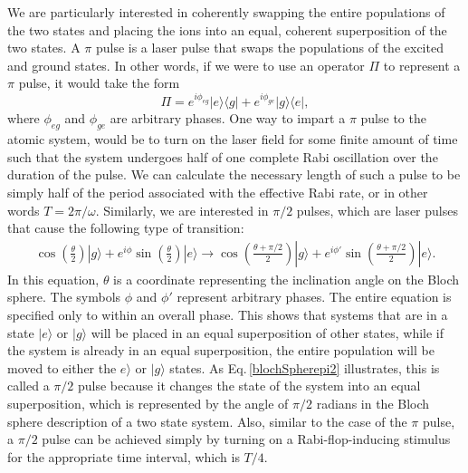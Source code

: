 We are particularly interested in coherently swapping the entire populations of the two states and placing the ions into an equal, coherent superposition of the two states.
A $\pi$ pulse is a laser pulse that swaps the populations of the excited and ground states. In other words, if we were to use an operator $\Pi$ to represent a $\pi$ pulse, it would take the form
\begin{equation}
\Pi=e^{i\phi_{eg}}|e\rangle\langle g|+e^{i\phi_{ge}}|g\rangle\langle e|,
\end{equation}
where $\phi_{eg}$ and $\phi_{ge}$ are arbitrary phases. 
One way to impart a $\pi$ pulse to the atomic system, would be to turn on the laser field for some finite amount of time such that the system undergoes half of one complete Rabi oscillation over the duration of the pulse. We can calculate the necessary length of such a pulse to be simply half of the period associated with the effective Rabi rate, or in other words $T = 2\pi/\omega$.
Similarly, we are interested in $\pi/2$ pulses, which are laser pulses that cause the following type of transition:
\begin{multline}
\cos\left(\frac{\theta}{2}\right)|g\rangle+
e^{i\phi}\sin\left(\frac{\theta}{2}\right)|e\rangle\rightarrow 
\cos\left(\frac{\theta+\pi/2}{2}\right)|g\rangle+
e^{i\phi'}\sin\left(\frac{\theta+\pi/2}{2}\right)|e\rangle.\label{blochSpherepi2}
\end{multline}
In this equation, $\theta$ is a coordinate representing the inclination angle on the Bloch sphere. The symbols $\phi$ and $\phi'$ represent arbitrary phases. The entire equation is specified only to within an overall phase. This shows that systems that are in a state $|e\rangle$ or $|g\rangle$ will be placed in an equal superposition of other states, while if the system is already in an equal superposition, the entire population will be moved to either the $e\rangle$ or $|g\rangle$ states.
As Eq.\,\eqref{blochSpherepi2} illustrates, this is called a $\pi/2$ pulse because it changes the state of the system into an equal superposition, which is represented by the angle of $\pi/2$ radians in the Bloch sphere description of a two state system. Also, similar to the case of the $\pi$ pulse, a $\pi/2$ pulse can be achieved simply by turning on a Rabi-flop-inducing stimulus for the appropriate time interval, which is $T/4$. 

